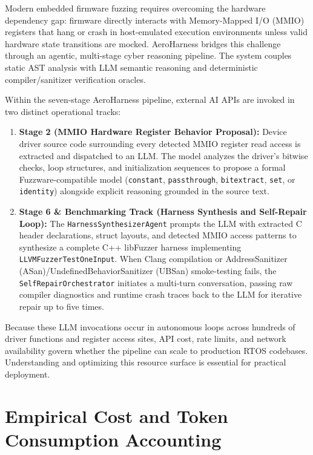 \documentclass[11pt,a4paper]{article}
\begin{document}
Modern embedded firmware fuzzing requires overcoming the hardware dependency gap: firmware directly interacts with Memory-Mapped I/O (MMIO) registers that hang or crash in host-emulated execution environments unless valid hardware state transitions are mocked. AeroHarness bridges this challenge through an agentic, multi-stage cyber reasoning pipeline. The system couples static AST analysis with LLM semantic reasoning and deterministic compiler/sanitizer verification oracles.

Within the seven-stage AeroHarness pipeline, external AI APIs are invoked in two distinct operational tracks:
\begin{enumerate}[leftmargin=1.8em, itemsep=0.3em]
    \item \textbf{Stage 2 (MMIO Hardware Register Behavior Proposal):} Device driver source code surrounding every detected MMIO register read access is extracted and dispatched to an LLM. The model analyzes the driver's bitwise checks, loop structures, and initialization sequences to propose a formal Fuzzware-compatible model (\texttt{constant}, \texttt{passthrough}, \texttt{bitextract}, \texttt{set}, or \texttt{identity}) alongside explicit reasoning grounded in the source text.
    \item \textbf{Stage 6 \& Benchmarking Track (Harness Synthesis and Self-Repair Loop):} The \texttt{HarnessSynthesizerAgent} prompts the LLM with extracted C header declarations, struct layouts, and detected MMIO access patterns to synthesize a complete C++ libFuzzer harness implementing \texttt{LLVMFuzzerTestOneInput}. When Clang compilation or AddressSanitizer (ASan)/UndefinedBehaviorSanitizer (UBSan) smoke-testing fails, the \texttt{SelfRepairOrchestrator} initiates a multi-turn conversation, passing raw compiler diagnostics and runtime crash traces back to the LLM for iterative repair up to five times.
\end{enumerate}

Because these LLM invocations occur in autonomous loops across hundreds of driver functions and register access sites, API cost, rate limits, and network availability govern whether the pipeline can scale to production RTOS codebases. Understanding and optimizing this resource surface is essential for practical deployment.

\section{Empirical Cost and Token Consumption Accounting}
\end{document}
